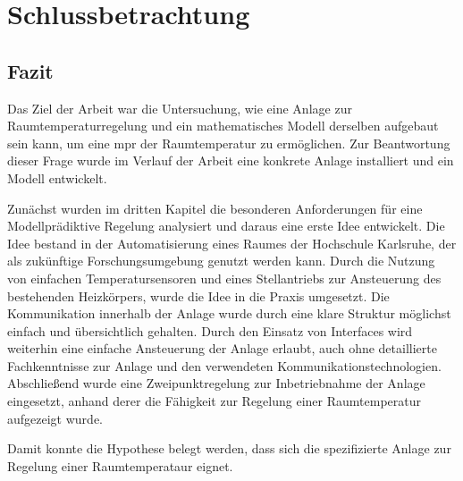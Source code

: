 %
%

\renewcommand{\chapterheadstartvskip}{\vspace*{3cm}}

\chapter{Schlussbetrachtung}
\label{chap:schlussteil}
\renewcommand{\chapterheadstartvskip}{\vspace*{-0.5cm}}

\section{Fazit}
\label{sec:zusammenfassung}

Das Ziel der Arbeit war die Untersuchung, wie eine Anlage zur Raumtemperaturregelung und ein mathematisches Modell derselben aufgebaut sein kann, um eine \acrlong{mpr} der Raumtemperatur zu ermöglichen.
Zur Beantwortung dieser Frage wurde im Verlauf der Arbeit eine konkrete Anlage installiert und ein Modell entwickelt.

Zunächst wurden im dritten Kapitel die besonderen Anforderungen für eine Modellprädiktive Regelung analysiert und daraus eine erste Idee entwickelt. Die Idee bestand in der Automatisierung eines Raumes der Hochschule Karlsruhe, der als zukünftige Forschungsumgebung genutzt werden kann. Durch die Nutzung von einfachen Temperatursensoren und eines Stellantriebs zur Ansteuerung des bestehenden Heizkörpers, wurde die Idee in die Praxis umgesetzt. Die Kommunikation innerhalb der Anlage wurde durch eine klare Struktur möglichst einfach und übersichtlich gehalten. Durch den Einsatz von Interfaces wird weiterhin eine einfache Ansteuerung der Anlage erlaubt, auch ohne detaillierte Fachkenntnisse zur Anlage und den verwendeten Kommunikationstechnologien. Abschließend wurde eine Zweipunktregelung zur Inbetriebnahme der Anlage eingesetzt, anhand derer die Fähigkeit zur Regelung einer Raumtemperatur aufgezeigt wurde.

Damit konnte die Hypothese belegt werden, dass sich die spezifizierte Anlage zur Regelung einer Raumtemperataur eignet.

